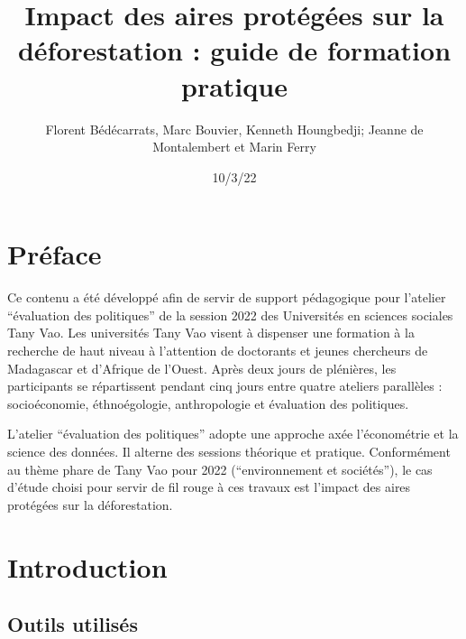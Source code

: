 \documentclass[
  letterpaper,
  DIV=11,
  numbers=noendperiod]{scrreprt}
\title{Impact des aires protégées sur la déforestation : guide de
formation pratique}
\author{Florent Bédécarrats, Marc Bouvier, Kenneth Houngbedji; Jeanne de
Montalembert et Marin Ferry}
\date{10/3/22}
\renewcommand*\contentsname{Table of contents}
\newcommand\contentsname{Table of contents}
\begin{document}
\maketitle
\ifdefined\Shaded\renewenvironment{Shaded}{\begin{tcolorbox}[sharp corners, borderline west={3pt}{0pt}{shadecolor}, enhanced, frame hidden, breakable, interior hidden, boxrule=0pt]}{\end{tcolorbox}}\fi

\renewcommand*\contentsname{Table of contents}
{
\hypersetup{linkcolor=}
\setcounter{tocdepth}{2}
\tableofcontents
}

\hypertarget{pruxe9face}{%
\chapter*{Préface}\label{pruxe9face}}


Ce contenu a été développé afin de servir de support pédagogique pour
l'atelier ``évaluation des politiques'' de la session 2022 des
Universités en sciences sociales Tany Vao. Les universités Tany Vao
visent à dispenser une formation à la recherche de haut niveau à
l'attention de doctorants et jeunes chercheurs de Madagascar et
d'Afrique de l'Ouest. Après deux jours de plénières, les participants se
répartissent pendant cinq jours entre quatre ateliers parallèles :
socioéconomie, éthnoégologie, anthropologie et évaluation des
politiques.

L'atelier ``évaluation des politiques'' adopte une approche axée
l'économétrie et la science des données. Il alterne des sessions
théorique et pratique. Conformément au thème phare de Tany Vao pour 2022
(``environnement et sociétés''), le cas d'étude choisi pour servir de
fil rouge à ces travaux est l'impact des aires protégées sur la
déforestation.


\hypertarget{introduction}{%
\chapter{Introduction}\label{introduction}}

\hypertarget{outils-utilisuxe9s}{%
\section{Outils utilisés}\label{outils-utilisuxe9s}}
\end{document}
